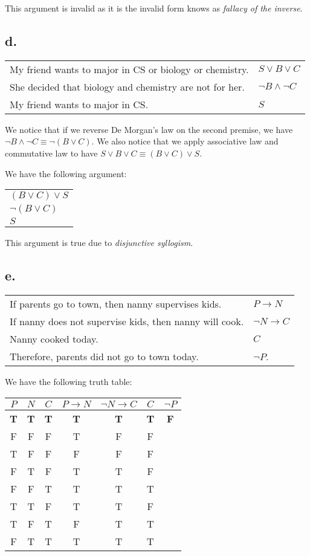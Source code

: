 \documentclass{article}
\begin{document}
This argument is invalid as it is the invalid form knows as \textit{fallacy of the inverse}.

\subsection*{d.}
\begin{tabular}{l|l}
    My friend wants to major in CS or biology or chemistry.& $S \lor B \lor C$\\
    She decided that biology and chemistry are not for her. & $\neg B \land \neg C$\\ \hline
    My friend wants to major in CS. & $S$
\end{tabular}

We notice that if we reverse De Morgan's law on the second premise, we have $\neg B \land \neg C \equiv \neg (B \lor C)$. We also notice that we apply associative law and commutative law to have $S \lor B \lor C \equiv (B \lor C) \lor S$.

We have the following argument:

\begin{tabular}{l}
    $(B \lor C) \lor S$\\
    $\neg (B \lor C)$\\ \hline
    $S$
\end{tabular}

This argument is true due to \textit{disjunctive syllogism}.

\subsection*{e.}
\begin{tabular}{l|l}
    If parents go to town, then nanny supervises kids. & $P \rightarrow N$ \\
    If nanny does not supervise kids, then nanny will cook. & $\neg N \rightarrow C$ \\
    Nanny cooked today. & $C$\\ \hline
    Therefore, parents did not go to town today.&$\neg P$.
\end{tabular}

We have the following truth table:

\begin{tabular}{ccc|ccc|c}
	$P$&$N$&$C$&$P \rightarrow N$&$\neg N \rightarrow C$&$C$&$\neg P$ \\ \hline
	\textbf{T}&\textbf{T}&\textbf{T}&\textbf{T}&\textbf{T}&\textbf{T}&\textbf{F}\\
	F&F&F&T&F&F& \\
	T&F&F&F&F&F& \\
	F&T&F&T&T&F& \\
	F&F&T&T&T&T& \\
	T&T&F&T&T&F& \\
	T&F&T&F&T&T& \\
	F&T&T&T&T&T& 
\end{tabular}
\end{document}
